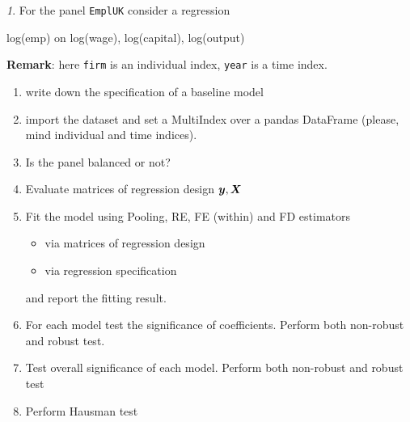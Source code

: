 \documentclass[12pt]{article}
\theoremstyle{remark}
\newtheorem{exercise}{}[section]
\begin{document}
\begin{exercise}
For the panel \texttt{EmplUK} consider a regression
\begin{center}
	log(emp) on log(wage), log(capital), log(output) 
\end{center}
\textbf{Remark}: here \texttt{firm} is an individual index, 
\texttt{year} is a time index.
\begin{enumerate}
	\item write down the specification of a baseline model
	\item import the dataset and set a MultiIndex over a pandas DataFrame 
	(please, mind  individual and time indices).
	\item Is the panel balanced or not?
	\item Evaluate matrices of regression design \({\bm y}, {\bm X}\)
	\item Fit the model using Pooling, RE, FE (within) and FD estimators
	\begin{itemize}
		\item via matrices of regression design
		\item via regression specification
	\end{itemize}
	and report the fitting result.
	\item For each model test the significance of coefficients. Perform both
	non-robust and robust test.
	\item Test overall significance of each model. Perform both
	non-robust and robust test
	\item Perform Hausman test
\end{enumerate}
\end{exercise}
\end{document}
